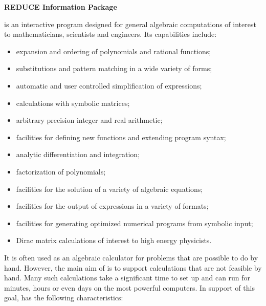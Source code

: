 \parindent 0pt
\parskip 6pt
\itemsep 0pt
\parsep 0pt
\topsep 0pt
\raggedbottom
\begin{center}
\LARGE
{\bf REDUCE Information Package}
\end{center}
{\REDUCE} is an interactive program designed for general algebraic
computations of interest to mathematicians, scientists and engineers.  Its
capabilities include:
\begin{itemize}
\item expansion and ordering of polynomials and rational functions;
\item substitutions and pattern matching in a wide variety of forms;
\item automatic and user controlled simplification of expressions;
\item calculations with symbolic matrices;
\item arbitrary precision integer and real arithmetic;
\item facilities for defining new functions and extending program syntax;
\item analytic differentiation and integration;
\item factorization of polynomials;
\item facilities for the solution of a variety of algebraic equations;
\item facilities for the output of expressions in a variety of formats;
\item facilities for generating optimized numerical programs from symbolic
input;
\item Dirac matrix calculations of interest to high energy physicists.
\end{itemize}
It is often used as an algebraic calculator for problems that are possible
to do by hand.  However, the main aim of {\REDUCE} is to support calculations
that are not feasible by hand.  Many such calculations take a significant
time to set up and can run for minutes, hours or even days on the most
powerful computers.  In support of this goal, {\REDUCE} has the following
characteristics:
